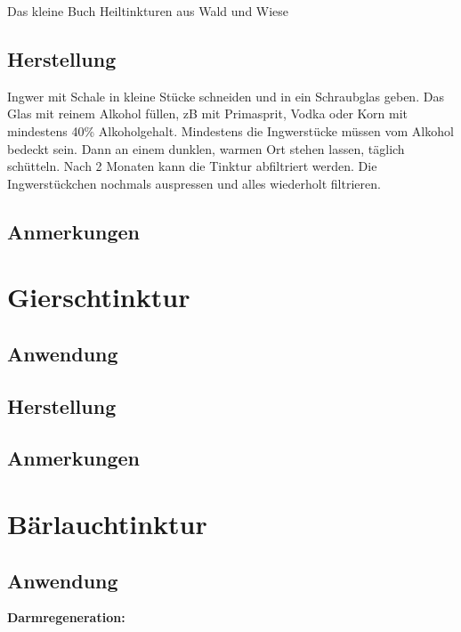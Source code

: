 \cite{celticingwer}
Das kleine Buch Heiltinkturen aus Wald und Wiese


\subsection{Herstellung}

Ingwer mit Schale in kleine Stücke schneiden und in ein Schraubglas geben. Das Glas mit reinem Alkohol füllen, zB mit Primasprit, Vodka oder Korn mit mindestens 40\% Alkoholgehalt. Mindestens die Ingwerstücke müssen vom Alkohol bedeckt sein. Dann an einem dunklen, warmen Ort stehen lassen, täglich schütteln. Nach 2 Monaten kann die Tinktur abfiltriert werden. Die Ingwerstückchen nochmals auspressen und alles wiederholt filtrieren.

\subsection{Anmerkungen}




\section{Gierschtinktur}

\subsection{Anwendung}

\subsection{Herstellung}

\subsection{Anmerkungen}





\section{Bärlauchtinktur}

\subsection{Anwendung}

\textbf{Darmregeneration:} \\ \\

